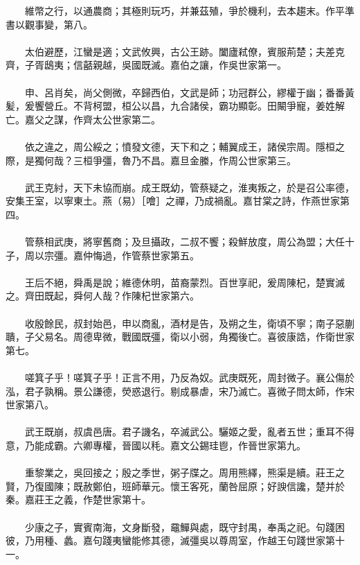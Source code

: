 　　維幣之行，以通農商；其極則玩巧，并兼茲殖，爭於機利，去本趨末。作平準書以觀事變，第八。
\\\\
　　太伯避歷，江蠻是適；文武攸興，古公王跡。闔廬弒僚，賓服荊楚；夫差克齊，子胥鴟夷；信嚭親越，吳國既滅。嘉伯之讓，作吳世家第一。
\\\\
　　申、呂肖矣，尚父側微，卒歸西伯，文武是師；功冠群公，繆權于幽；番番黃髪，爰饗營丘。不背柯盟，桓公以昌，九合諸侯，霸功顯彰。田闞爭寵，姜姓解亡。嘉父之謀，作齊太公世家第二。
\\\\
　　依之違之，周公綏之；憤發文德，天下和之；輔翼成王，諸侯宗周。隱桓之際，是獨何哉？三桓爭彊，魯乃不昌。嘉旦金縢，作周公世家第三。
\\\\
　　武王克紂，天下未協而崩。成王既幼，管蔡疑之，淮夷叛之，於是召公率德，安集王室，以寧東土。燕（易）［噲］之禪，乃成禍亂。嘉甘棠之詩，作燕世家第四。
\\\\
　　管蔡相武庚，將寧舊商；及旦攝政，二叔不饗；殺鮮放度，周公為盟；大任十子，周以宗彊。嘉仲悔過，作管蔡世家第五。
\\\\
　　王后不絕，舜禹是說；維德休明，苗裔蒙烈。百世享祀，爰周陳杞，楚實滅之。齊田既起，舜何人哉？作陳杞世家第六。
\\\\
　　收殷餘民，叔封始邑，申以商亂，酒材是告，及朔之生，衛頃不寧；南子惡蒯聵，子父易名。周德卑微，戰國既彊，衛以小弱，角獨後亡。喜彼康誥，作衛世家第七。
\\\\
　　嗟箕子乎！嗟箕子乎！正言不用，乃反為奴。武庚既死，周封微子。襄公傷於泓，君子孰稱。景公謙德，熒惑退行。剔成暴虐，宋乃滅亡。喜微子問太師，作宋世家第八。
\\\\
　　武王既崩，叔虞邑唐。君子譏名，卒滅武公。驪姬之愛，亂者五世；重耳不得意，乃能成霸。六卿專權，晉國以秏。嘉文公錫珪鬯，作晉世家第九。
\\\\
　　重黎業之，吳回接之；殷之季世，粥子牒之。周用熊繹，熊渠是續。莊王之賢，乃復國陳；既赦鄭伯，班師華元。懷王客死，蘭咎屈原；好諛信讒，楚并於秦。嘉莊王之義，作楚世家第十。
\\\\
　　少康之子，實賓南海，文身斷發，黿鱓與處，既守封禺，奉禹之祀。句踐困彼，乃用種、蠡。嘉句踐夷蠻能修其德，滅彊吳以尊周室，作越王句踐世家第十一。
\\\\
